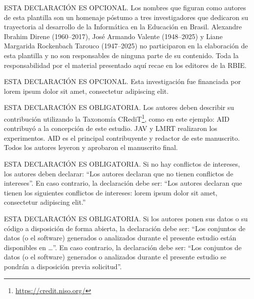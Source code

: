 \documentclass[spanish]{rbie2026}%
\begin{document}
\begin{declarations}

\begin{acknowledgements}
ESTA DECLARACIÓN ES OPCIONAL. Los nombres que figuran como autores de esta plantilla son un homenaje póstumo a tres investigadores que dedicaron su trayectoria al desarrollo de la Informática en la Educación en Brasil. Alexandre Ibrahim Direne (1960--2017), José Armando Valente (1948--2025) y Liane Margarida Rockenbach Tarouco (1947--2025) no participaron en la elaboración de esta plantilla y no son responsables de ninguna parte de su contenido. Toda la responsabilidad por el material presentado aquí recae en los editores de la RBIE.
\end{acknowledgements}

\begin{funding}
ESTA DECLARACIÓN ES OPCIONAL. Esta investigación fue financiada por lorem ipsum dolor sit amet, consectetur adipiscing elit.
\end{funding}

\begin{contributions}
ESTA DECLARACIÓN ES OBLIGATORIA. Los autores deben describir su contribución utilizando la Taxonomía CRediT\footnote{\url{https://credit.niso.org/}}, como en este ejemplo: AID contribuyó a la concepción de este estudio. JAV y LMRT realizaron los experimentos. AID es el principal contribuyente y redactor de este manuscrito. Todos los autores leyeron y aprobaron el manuscrito final.
\end{contributions}

\begin{interests}
ESTA DECLARACIÓN ES OBLIGATORIA. Si no hay conflictos de intereses, los autores deben declarar: ``Los autores declaran que no tienen conflictos de intereses''. En caso contrario, la declaración debe ser: ``Los autores declaran que tienen los siguientes conflictos de intereses: lorem ipsum dolor sit amet, consectetur adipiscing elit.''
\end{interests}

\begin{materials}
ESTA DECLARACIÓN ES OBLIGATORIA.
  Si los autores ponen sus datos o su código a disposición de forma abierta, la declaración debe ser: ``Los conjuntos de datos (o el software) generados o analizados durante el presente estudio están disponibles en \ldots''. En caso contrario, la declaración debe ser: ``Los conjuntos de datos (o el software) generados o analizados durante el presente estudio se pondrán a disposición previa solicitud''.
\end{materials}


\end{declarations}
\end{document}
